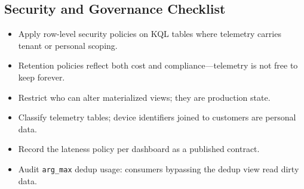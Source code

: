 \subsection{Security and Governance Checklist}
\begin{itemize}
    \item Apply row-level security policies on KQL tables where telemetry carries tenant or personal scoping.
    \item Retention policies reflect both cost and compliance---telemetry is not free to keep forever.
    \item Restrict who can alter materialized views; they are production state.
    \item Classify telemetry tables; device identifiers joined to customers are personal data.
    \item Record the lateness policy per dashboard as a published contract.
    \item Audit \texttt{arg\_max} dedup usage: consumers bypassing the dedup view read dirty data.
\end{itemize}

